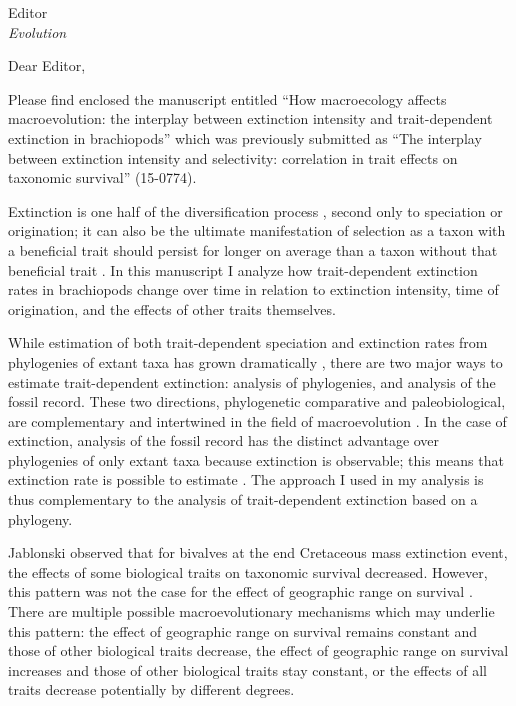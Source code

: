 \documentclass{letter}
\begin{document}
\begin{letter}{Editor \\ \textit{Evolution}}
  \opening{Dear Editor,}

  Please find enclosed the manuscript entitled ``How macroecology affects macroevolution: the interplay between extinction intensity and trait-dependent extinction in brachiopods'' which was previously submitted as ``The interplay between extinction intensity and selectivity: correlation in trait effects on taxonomic survival'' (15-0774).
  
  Extinction is one half of the diversification process \cite{Raup1994,Stanley1979,Stanley1975}, second only to speciation or origination; it can also be the ultimate manifestation of selection as a taxon with a beneficial trait should persist for longer on average than a taxon without that beneficial trait \cite{Rabosky2010b,Jablonski2008a,Raup1994,Stanley1975}. In this manuscript I analyze how trait-dependent extinction rates in brachiopods change over time in relation to extinction intensity, time of origination, and the effects of other traits themselves.

  While estimation of both trait-dependent speciation and extinction rates from phylogenies of extant taxa has grown dramatically \cite{Maddison2007,Fitzjohn2010,Goldberg2011a,Goldberg2005,Rabosky2013,Stadler2013b,Stadler2011a,Stadler2013a}, there are two major ways to estimate trait-dependent extinction: analysis of phylogenies, and analysis of the fossil record. These two directions, phylogenetic comparative and paleobiological, are complementary and intertwined in the field of macroevolution \cite{Rabosky2010b,Jablonski2008a,Hunt2014a}. In the case of extinction, analysis of the fossil record has the distinct advantage over phylogenies of only extant taxa because extinction is observable; this means that extinction rate is possible to estimate \cite{Rabosky2010a,Quental2009,Liow2010a}. The approach I used in my analysis is thus complementary to the analysis of trait-dependent extinction based on a phylogeny.

  Jablonski \cite{Jablonski1986} observed that for bivalves at the end Cretaceous mass extinction event, the effects of some biological traits on taxonomic survival decreased. However, this pattern was not the case for the effect of geographic range on survival \cite{Jablonski1986,Payne2007}. There are multiple possible macroevolutionary mechanisms which may underlie this pattern: the effect of geographic range on survival remains constant and those of other biological traits decrease, the effect of geographic range on survival increases and those of other biological traits stay constant, or the effects of all traits decrease potentially by different degrees.


\end{letter}
\end{document}
